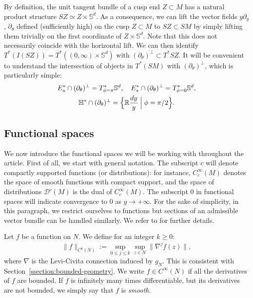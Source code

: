 \documentclass[JEP,XML,SOM,Unicode,NoFloatCountersInSection]{cedram}
\newcommand{\R}{\mathbb{R}}
\newcommand{\HH}{\mathbb{H}}
\newcommand{\Ss}{\mathbb{S}}
\newcommand{\mc}{\mathcal}
\newcommand{\ZZ}{I(SZ)}
\theoremstyle{plain}
\theoremstyle{definition}
\begin{document}
By definition, the unit tangent bundle of a cusp end $Z \subset M$ has a natural product structure $SZ \simeq Z \times \Ss^d$. As a consequence, we can lift the vector fields $y\partial_y$, $\partial_\theta$ defined (sufficiently high) on the cusp $Z \subset M$ to $SZ \subset SM$ by simply lifting them trivially on the first coordinate of $Z \times \Ss^d$. Note that this does not necessarily coincide with the horizontal lift. We can then identify $T^\ast(\ZZ) = T^\ast ((0,\infty)\times\Ss^d)$ with $(\partial_\theta)^\perp\subset T^\ast SZ$. It will be convenient to understand the intersection of objects in $T^\ast (SM)$ with $(\partial_\theta)^\perp$, which is particularly simple:
\begin{equation}\label{eq:indicial-WF}
\begin{gathered}
E^\ast_u\cap(\partial_\theta)^\perp = T^\ast_{\phi=\pi}\Ss^d,\quad E^\ast_s\cap(\partial_\theta)^\perp = T^\ast_{\phi=0}\Ss^d,\\ \HH^\ast \cap (\partial_\theta)^\perp = \Bigl\{\R\frac{dy}{y} \Bigm|\phi= \pi/2\Bigr\}.
\end{gathered}
\end{equation}

\subsection{Functional spaces}

\label{sec:fun}

We now introduce the functional spaces we will be working with throughout the article. First of all, we start with general notation. The subscript $c$ will denote compactly supported functions (or distributions): for instance, $C^\infty_c(M)$ denotes the space of smooth functions with compact support, and the space of distributions $\mc{D}'(M)$ is the dual of $C^\infty_c(M)$. The subscript $0$ in functional spaces will indicate convergence to $0$ as $y \to +\infty$. For the sake of simplicity, in this paragraph, we restrict ourselves to functions but sections of an admissible vector bundle can be handled similarly. We refer to \cite[\S 2.1.2]{Bonthonneau-Lefeuvre-19-1} for further details.

Let $f$ be a function on $N$. We define for an integer $k \geq 0$:
\[
\|f\|_{C^k(N)} := \sup_{0 \leq j \leq k} \sup_{z \in N}\|\nabla^j f(z)\|,
\]
where $\nabla$ is the Levi-Civita connection induced by $g_N$. This is consistent with Section~\ref{ssection:bounded-geometry}. We write $f \in C^\infty(N)$ if all the derivatives of $f$ are bounded. If $f$ is infinitely many times differentiable, but its derivatives are not bounded, we simply say that $f$ is \textit{smooth}.
\end{document}
